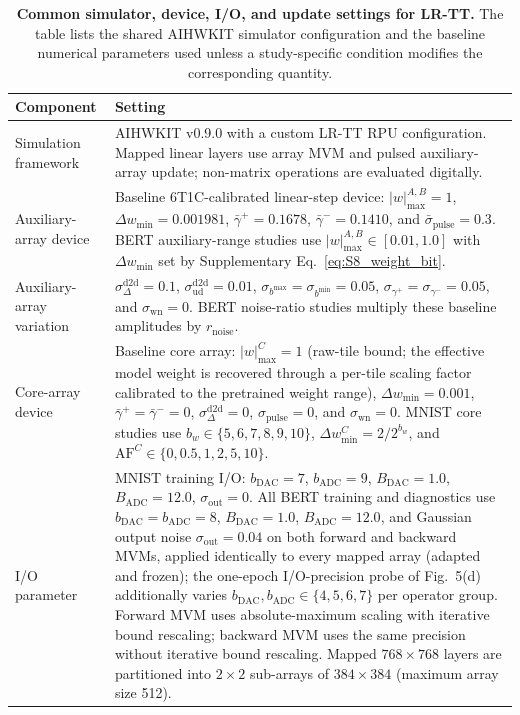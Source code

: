 \documentclass[fleqn,10pt]{wlscirep}
\begin{document}
\begin{table}[!htbp]
\centering
\caption{\textbf{Common simulator, device, I/O, and update settings for LR-TT.}
The table lists the shared AIHWKIT simulator configuration and the baseline numerical parameters used unless a study-specific condition modifies the corresponding quantity.}
\label{tab:S8_hardware_simulator}
\small
\renewcommand{\arraystretch}{1.10}
\setlength{\tabcolsep}{4.0pt}
\begin{tabularx}{\linewidth}{p{3.0cm}Y}
\toprule
{}
\textbf{Component} & \textbf{Setting} \\
\midrule
Simulation framework &
AIHWKIT v0.9.0 with a custom LR-TT RPU configuration. Mapped linear layers use array MVM and pulsed auxiliary-array update; non-matrix operations are evaluated digitally. \\
\midrule
Auxiliary-array device &
Baseline 6T1C-calibrated linear-step device: \(|w|_{\max}^{A,B}=1\), \(\Delta w_{\min}=0.001981\), \(\bar{\gamma}^{+}=0.1678\), \(\bar{\gamma}^{-}=0.1410\), and \(\bar{\sigma}_{\mathrm{pulse}}=0.3\). BERT auxiliary-range studies use \(|w|_{\max}^{A,B}\in[0.01,1.0]\) with \(\Delta w_{\min}\) set by Supplementary Eq.~\eqref{eq:S8_weight_bit}. \\
\midrule
Auxiliary-array variation &
\(\sigma_{\Delta}^{\mathrm{d2d}}=0.1\), \(\sigma_{\mathrm{ud}}^{\mathrm{d2d}}=0.01\), \(\sigma_{b^{\max}}=\sigma_{b^{\min}}=0.05\), \(\sigma_{\gamma^{+}}=\sigma_{\gamma^{-}}=0.05\), and \(\sigma_{\mathrm{wn}}=0\). BERT noise-ratio studies multiply these baseline amplitudes by \(r_{\mathrm{noise}}\). \\
\midrule
Core-array device &
Baseline core array: \(|w|_{\max}^{C}=1\) (raw-tile bound; the effective model weight is recovered through a per-tile scaling factor calibrated to the pretrained weight range), \(\Delta w_{\min}=0.001\), \(\bar{\gamma}^{+}=\bar{\gamma}^{-}=0\), \(\sigma_{\Delta}^{\mathrm{d2d}}=0\), \(\sigma_{\mathrm{pulse}}=0\), and \(\sigma_{\mathrm{wn}}=0\). MNIST core studies use \(b_w\in\{5,6,7,8,9,10\}\), \(\Delta w_{\min}^{C}=2/2^{b_w}\), and \(\mathrm{AF}^{C}\in\{0,0.5,1,2,5,10\}\). \\
\midrule
I/O parameter &
MNIST training I/O: \(b_{\mathrm{DAC}}=7\), \(b_{\mathrm{ADC}}=9\), \(B_{\mathrm{DAC}}=1.0\), \(B_{\mathrm{ADC}}=12.0\), \(\sigma_{\mathrm{out}}=0\). All BERT training and diagnostics use \(b_{\mathrm{DAC}}=b_{\mathrm{ADC}}=8\), \(B_{\mathrm{DAC}}=1.0\), \(B_{\mathrm{ADC}}=12.0\), and Gaussian output noise \(\sigma_{\mathrm{out}}=0.04\) on both forward and backward MVMs, applied identically to every mapped array (adapted and frozen); the one-epoch I/O-precision probe of Fig.~5(d) additionally varies \(b_{\mathrm{DAC}},b_{\mathrm{ADC}}\in\{4,5,6,7\}\) per operator group. Forward MVM uses absolute-maximum scaling with iterative bound rescaling; backward MVM uses the same precision without iterative bound rescaling. Mapped \(768\times768\) layers are partitioned into \(2\times2\) sub-arrays of \(384\times384\) (maximum array size 512). \\

\end{tabularx}
\end{table}
\end{document}
